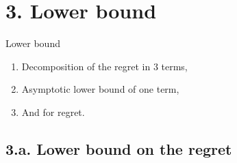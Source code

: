 \documentclass[12pt,english,ignorenonframetext,aspectratio=169,]{beamer}
\providecommand{\tightlist}{%
  \setlength{\itemsep}{0pt}\setlength{\parskip}{0pt}}
\begin{document}
\section{\hfill{}3. Lower bound\hfill{}}

\begin{frame}{Lower bound}

\begin{enumerate}
\def\labelenumi{\arabic{enumi}.}
\tightlist
\item
  Decomposition of the regret in \(3\) terms,\vspace*{15pt}
\item
  Asymptotic lower bound of one term,\vspace*{15pt}
\item
  And for regret.
\end{enumerate}

\end{frame}



\subsection{\hfill{}3.a. Lower bound on the regret\hfill{}}
\end{document}
